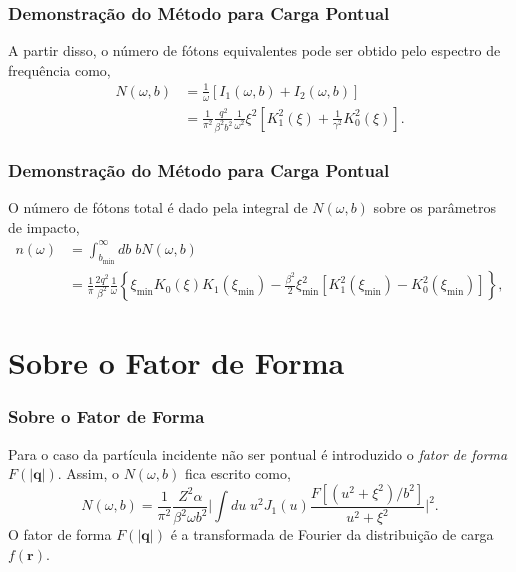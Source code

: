 \documentclass[xcolor=dvipsnames]{beamer}
\renewcommand{\vec}{\mathbf}
\begin{document}
\begin{frame}
	\frametitle{Demonstração do Método para Carga Pontual}
	A partir disso, o número de fótons equivalentes pode ser obtido pelo
	espectro de frequência como,
	\begin{equation}
		\begin{split}
		N(\omega , b) &= \frac{1}{\omega} \left[ I_1 (\omega , b) + I_2(\omega
			, b) \right]\\
			&= \frac{1}{\pi ^2} \frac{q^2} {\beta ^2 b^2}
			\frac{1}{\omega ^2} \xi ^2 \left[K_1^2 (\xi ) + \frac{1}{\gamma ^2}
			K_0 ^2 (\xi ) \right]. \label{eq_EP-SPEC}
		\end{split}
	\end{equation}
\end{frame}

\begin{frame}
	\frametitle{Demonstração do Método para Carga Pontual}
	O número de fótons total é dado pela integral de $N(\omega , b)$ sobre os
	parâmetros de impacto,
	\begin{equation}
	\begin{split}
		n(\omega) &= \int _{b_{\text{min}}}^\infty db\; bN(\omega , b) \\ 
		&= \frac{1}{\pi} \frac{2q^2}{\beta ^2} \frac{1}{\omega} \left\{ \xi
		_\text{min} K_0 \left( \xi \right) K_1 \left( \xi _\text{min} \right) -
		\frac{\beta ^2}{2} \xi _\text{min} ^2 \left[ K_1 ^2 \left( \xi
		_\text{min} \right) - K_0 ^2 \left( \xi _\text{min} \right) \right]
		\right\}, \label{eq_EPT}
	\end{split}
	\end{equation}
\end{frame}

\section{Sobre o Fator de Forma}
\begin{frame}
	\frametitle{Sobre o Fator de Forma}
	Para o caso da partícula incidente não ser pontual é introduzido o
	\textit{fator de forma} $F(|\vec{q}|)$. Assim, o $N(\omega , b)$ fica
	escrito como,
	\begin{equation}
		N(\omega , b) = \frac{1}{\pi ^2} \frac{Z^2 \alpha}{\beta ^2 \omega b^2}
		\Bigg| \int du \; u^2 J_1 (u) \frac{F[(u^2 + \xi ^2)/b^2]}{u^2 + \xi ^2}
		\Bigg|^2. \label{eq_EP-SPEC-F}
	\end{equation}
	O fator de forma $F(|\vec{q}|)$ é a transformada de Fourier da distribuição
	de carga $f(\vec{r})$.
\end{frame}
\end{document}
